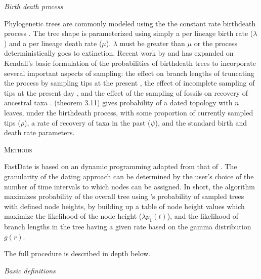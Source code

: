\documentclass[12pt,letterpaper]{article}
\renewcommand{\section}[1]{%
\bigskip
\begin{center}
\begin{Large}
\normalfont\scshape #1
\medskip
\end{Large}
\end{center}}
\renewcommand{\subsection}[1]{%
\bigskip
\begin{center}
\begin{large}
\normalfont\itshape #1
\end{large}
\end{center}}
\begin{document}
\subsection{Birth death process}
Phylogenetic trees are commonly modeled using the the constant rate birth\textendash death process \cite{Kendall1948}.
The tree shape is parameterized using simply a per lineage birth rate ($\lambda$) and a per lineage death rate ($\mu$).
$\lambda$ must be greater than $\mu$ or the process deterministically goes to extinction.
Recent work by \citet{Gernhard2008} and \citet{Stadler2009, Stadler2010} has expanded on Kendall's basic 
formulation of the probabilities of birth\textendash death trees to incorporate several important aspects of sampling:
the effect on branch lengths of truncating the process by sampling tips at the present \citep{Gernhard2008},
the effect of incomplete sampling of tips at the present day \citep{Stadler2009}, and the effect of the sampling
of fossils on recovery of ancestral taxa \citep{Stadler2010}.
\citet{Stadler2010} (theorem 3.11) gives probability of a dated topology with $n$ leaves,
under the birth\textendash death process, with some proportion of currently sampled tips ($\rho$), a rate of recovery of taxa in the past ($\psi$),
and the standard birth and death rate parameters.


\section{Methods}
FastDate is based on an dynamic programming adapted from that of \citet{Akerborg2008}.
The granularity of the dating approach can be determined by the user's choice of the number of time intervals to which 
nodes can be assigned.
In short, the algorithm maximizes probability of the overall tree using \cite{Stadler2010} 's probability of sampled trees with defined node heights,
by building up a table of node height values which maximize the likelihood of the node height ($\lambda p_1(t)$), 
and the likelihood of branch lengths in the tree having a given rate based on the gamma distribution $g(r)$.

The full procedure is described in depth below.

\subsection{Basic definitions}
\end{document}

